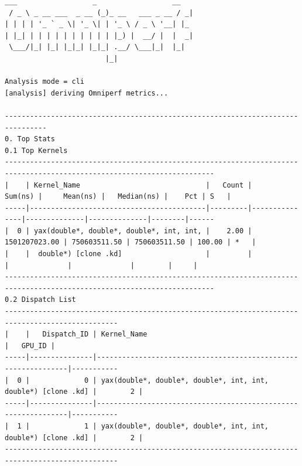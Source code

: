 \documentclass[
]{article}
\begin{document}
\begin{Verbatim}[fontsize=\footnotesize] 
                                                                                                                                                                                                                  ___                  _                  __
 / _ \ _ __ ___  _ __ (_)_ __   ___ _ __ / _|
| | | | '_ ` _ \| '_ \| | '_ \ / _ \ '__| |_
| |_| | | | | | | | | | | |_) |  __/ |  |  _|
 \___/|_| |_| |_|_| |_|_| .__/ \___|_|  |_|
                        |_|

Analysis mode = cli
[analysis] deriving Omniperf metrics...
                                                                                                                                                                                                                --------------------------------------------------------------------------------
0. Top Stats
0.1 Top Kernels
------------------------------------------------------------------------------------------------------------------------
|    | Kernel_Name                              |   Count |       Sum(ns) |     Mean(ns) |   Median(ns) |    Pct | S   |
-----|------------------------------------------|---------|---------------|--------------|--------------|--------|------
|  0 | yax(double*, double*, double*, int, int, |    2.00 | 1501207023.00 | 750603511.50 | 750603511.50 | 100.00 | *   |
|    |  double*) [clone .kd]                    |         |               |              |              |        |     |
------------------------------------------------------------------------------------------------------------------------                                                                                        0.2 Dispatch List
-------------------------------------------------------------------------------------------------
|    |   Dispatch_ID | Kernel_Name                                                   |   GPU_ID |
-----|---------------|---------------------------------------------------------------|-----------
|  0 |             0 | yax(double*, double*, double*, int, int, double*) [clone .kd] |        2 |
-----|---------------|---------------------------------------------------------------|-----------
|  1 |             1 | yax(double*, double*, double*, int, int, double*) [clone .kd] |        2 |
-------------------------------------------------------------------------------------------------


\end{Verbatim}
\end{document}
